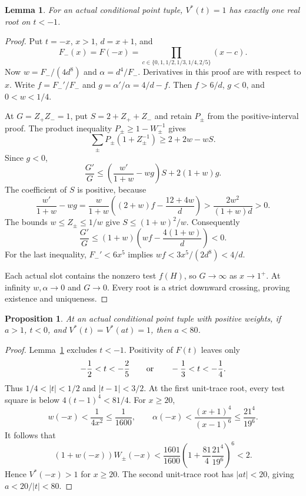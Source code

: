 \documentclass[11pt,a4paper]{article}
\newtheorem{lemma}[theorem]{Lemma}
\newtheorem{proposition}[theorem]{Proposition}
\begin{document}
\begin{lemma}\label{lem:unit-trace-negative-outer}
For an actual conditional point tuple, $V^*(t)=1$ has exactly one
real root on $t<-1$.
\end{lemma}
\begin{proof}
Put $t=-x$, $x>1$, $d=x+1$, and
\[
 F_-(x)=F(-x)=\prod_{c\in\{0,1,1/2,1/3,1/4,2/5\}}(x-c).
\]
Now $w=F_-/(4d^8)$ and $\alpha=d^4/F_-$. Derivatives in this
proof are with respect to $x$. Write $f=F_-'/F_-$ and
$g=\alpha'/\alpha=4/d-f$. Then $f>6/d$, $g<0$, and $0<w<1/4$.

At $G=Z_+Z_-=1$, put $S=2+Z_++Z_-$ and retain $P_\pm$ from
the positive-interval proof. The product inequality
$P_\pm\ge1-W_\pm^{-1}$ gives
\[
 \sum_\pm P_\pm(1+Z_\pm^{-1})\ge2+2w-wS.
\]
Since $g<0$,
\[
 \frac{G'}G\le
 \left(\frac{w'}{1+w}-wg\right)S+2(1+w)g.
\]
The coefficient of $S$ is positive, because
\[
 \frac{w'}{1+w}-wg
 =\frac{w}{1+w}
   \left((2+w)f-\frac{12+4w}{d}\right)
 >\frac{2w^2}{(1+w)d}>0.
\]
The bounds $w\le Z_\pm\le1/w$ give $S\le(1+w)^2/w$.
Consequently
\[
 \frac{G'}G\le(1+w)\left(wf-\frac{4(1+w)}d\right)<0.
\]
For the last inequality, $F_-'<6x^5$ implies
$wf<3x^5/(2d^8)<4/d$.

Each actual slot contains the nonzero test $f(H)$, so $G\to\infty$
as $x\to1^+$. At infinity $w,\alpha\to0$ and $G\to0$.
Every root is a strict downward crossing, proving existence and uniqueness.
\end{proof}

\begin{proposition}\label{prop:unit-trace-negative-scale}
At an actual conditional point tuple with positive weights, if
$a>1$, $t<0$, and $V^*(t)=V^*(at)=1$, then $a<80$.
\end{proposition}
\begin{proof}
Lemma~\ref{lem:unit-trace-negative-outer} excludes $t<-1$.
Positivity of $F(t)$ leaves only
\[
          -\frac12<t<-\frac25\qquad\hbox{or}\qquad
          -\frac13<t<-\frac14.
\]
Thus $1/4<|t|<1/2$ and $|t-1|<3/2$. At the first unit-trace root,
every test square is below $4(t-1)^4<81/4$. For $x\ge20$,
\[
 w(-x)<\frac1{4x^2}\le\frac1{1600},\qquad
 \alpha(-x)<\frac{(x+1)^4}{(x-1)^6}
                         \le\frac{21^4}{19^6}.
\]
It follows that
\[
 (1+w(-x))W_\pm(-x)
 <\frac{1601}{1600}
       \left(1+\frac{81}{4}\frac{21^4}{19^6}\right)^6<2.
\]
Hence $V^*(-x)>1$ for $x\ge20$. The second unit-trace root has
$|at|<20$, giving $a<20/|t|<80$.
\end{proof}
\end{document}
